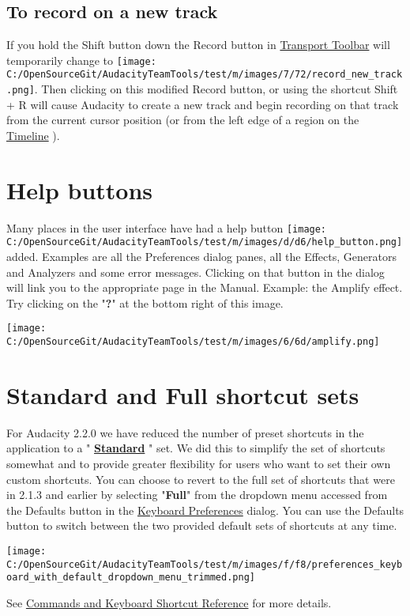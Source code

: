 \begin{multicols}{2}
\subsection{To record on a new track}If you hold the Shift button down the Record button in 
\hyperref[transport_toolbar_]{Transport Toolbar}
 will temporarily change to \texttt{[image: C:/OpenSourceGit/AudacityTeamTools/test/m/images/7/72/record\_new\_track.png]}. Then clicking on this modified Record button, or using the shortcut Shift + R will cause Audacity to create a new track and begin recording on that track from the current cursor position (or from the left edge of a region on the 
\hyperref[timeline_]{Timeline}
). 

\section{Help buttons}Many places in the user interface have had a help button \texttt{[image: C:/OpenSourceGit/AudacityTeamTools/test/m/images/d/d6/help\_button.png]} added. Examples are all the Preferences dialog panes, all the Effects, Generators and Analyzers and some error messages.
Clicking on that button in the dialog will link you to the appropriate page in the Manual.
Example: the Amplify effect.  Try clicking on the "\textbf{?}" at the bottom right of this image.
\par \texttt{[image: C:/OpenSourceGit/AudacityTeamTools/test/m/images/6/6d/amplify.png]}\par 
\section{Standard and Full shortcut sets}For Audacity 2.2.0 we have reduced the number of preset shortcuts in the application to a "\textbf{
\hyperref[keyboard_shortcut_reference_]{Standard}
}" set.  We did this to simplify the set of shortcuts somewhat and to provide greater flexibility for users who want to set their own custom shortcuts.
You can choose to revert to the full set of shortcuts that were in 2.1.3 and earlier by selecting "\textbf{Full}" from the dropdown menu accessed from the Defaults button in the 
\hyperref[keyboard_preferences_]{Keyboard Preferences}
 dialog.
You can use the Defaults button to switch between the two provided default sets of shortcuts at any time.
\par \texttt{[image: C:/OpenSourceGit/AudacityTeamTools/test/m/images/f/f8/preferences\_keyboard\_with\_default\_dropdown\_menu\_trimmed.png]}\par See 
\hyperref[keyboard_shortcut_reference_]{Commands and Keyboard Shortcut Reference}
 for more details.


\end{multicols}

